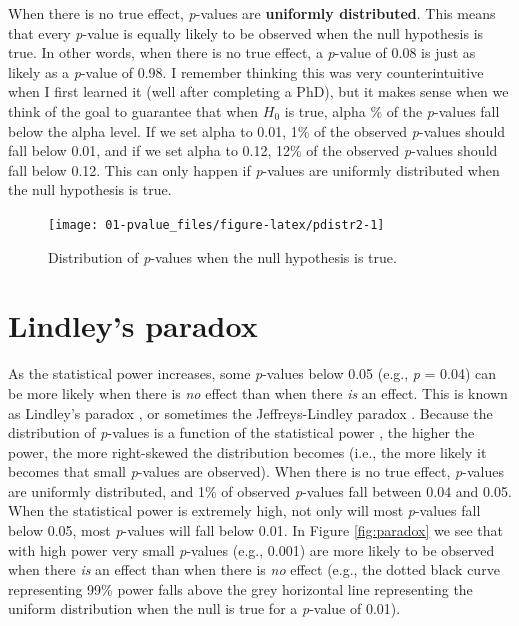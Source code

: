 \documentclass[
  oneside]{book}
\begin{document}
When there is no true effect, \emph{p}-values are \textbf{uniformly distributed}. This means that every \emph{p}-value is equally likely to be observed when the null hypothesis is true. In other words, when there is no true effect, a \emph{p}-value of 0.08 is just as likely as a \emph{p}-value of 0.98. I remember thinking this was very counterintuitive when I first learned it (well after completing a PhD), but it makes sense when we think of the goal to guarantee that when \(H_0\) is true, alpha \% of the \emph{p}-values fall below the alpha level. If we set alpha to 0.01, 1\% of the observed \emph{p}-values should fall below 0.01, and if we set alpha to 0.12, 12\% of the observed \emph{p}-values should fall below 0.12. This can only happen if \emph{p}-values are uniformly distributed when the null hypothesis is true.



\begin{figure}

{\centering \texttt{[image: 01-pvalue\_files/figure-latex/pdistr2-1]} 

}

\caption{Distribution of \emph{p}-values when the null hypothesis is true.}\label{fig:pdistr2}
\end{figure}

\hypertarget{lindley}{%
\section{Lindley's paradox}\label{lindley}}

As the statistical power increases, some \emph{p}-values below 0.05 (e.g., \emph{p} = 0.04) can be more likely when there is \emph{no} effect than when there \emph{is} an effect. This is known as Lindley's paradox \citep{lindley_statistical_1957}, or sometimes the Jeffreys-Lindley paradox \citep{spanos_who_2013}. Because the distribution of \emph{p}-values is a function of the statistical power \citep{cumming_replication_2008}, the higher the power, the more right-skewed the distribution becomes (i.e., the more likely it becomes that small \emph{p}-values are observed). When there is no true effect, \emph{p}-values are uniformly distributed, and 1\% of observed \emph{p}-values fall between 0.04 and 0.05. When the statistical power is extremely high, not only will most \emph{p}-values fall below 0.05, most \emph{p}-values will fall below 0.01. In Figure \ref{fig:paradox} we see that with high power very small \emph{p}-values (e.g., 0.001) are more likely to be observed when there \emph{is} an effect than when there is \emph{no} effect (e.g., the dotted black curve representing 99\% power falls above the grey horizontal line representing the uniform distribution when the null is true for a \emph{p}-value of 0.01).
\end{document}
